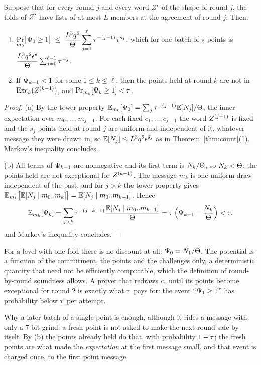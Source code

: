 \begin{lemma}[Potential]\label{lem:T}
Suppose that for every round $j$ and every word $Z'$ of the shape of round $j$, the folds of $Z'$ have lists of at most $L$ members at the agreement of round $j$. Then:
\begin{enumerate}[itemsep=1pt,topsep=2pt,label=\textnormal{(\alph*)}]
\item $\displaystyle\Pr_{m_0}\bigl[\Psi_0\ge1\bigr]\;\le\;\frac{L^3q^6}{\Theta}\sum_{j=1}^{\ell}\tau^{-(j-1)}\,\epsilon^{\bar s_j}$, which for one batch of $s$ points is $\dfrac{L^3q^6\epsilon^{s}}{\Theta}\sum_{j=0}^{\ell-1}\tau^{-j}$.
\item If $\Psi_{k-1}<1$ for some $1\le k\le\ell$, then the points held at round $k$ are not in $\operatorname{Exc}_k(Z^{(k-1)})$, and $\Pr_{m_k}[\Psi_k\ge1]<\tau$.
\end{enumerate}
\end{lemma}
\begin{proof}
(a) By the tower property $\mathbb{E}_{m_0}[\Psi_0]=\sum_j\tau^{-(j-1)}\mathbb{E}[N_j]/\Theta$, the inner expectation over $m_0,\dots,m_{j-1}$. For each fixed $c_1,\dots,c_{j-1}$ the word $Z^{(j-1)}$ is fixed and the $\bar s_j$ points held at round $j$ are uniform and independent of it, whatever message they were drawn in, so $\mathbb{E}[N_j]\le L^3q^6\epsilon^{\bar s_j}$ as in Theorem~\ref{thm:count}(1). Markov's inequality concludes.

(b) All terms of $\Psi_{k-1}$ are nonnegative and its first term is $N_k/\Theta$, so $N_k<\Theta$: the points held are not exceptional for $Z^{(k-1)}$. The message $m_k$ is one uniform draw independent of the past, and for $j>k$ the tower property gives $\mathbb{E}_{m_k}\bigl[\mathbb{E}[N_j\mid m_0..m_k]\bigr]=\mathbb{E}[N_j\mid m_0..m_{k-1}]$. Hence
\[
\mathbb{E}_{m_k}[\Psi_k]=\sum_{j>k}\tau^{-(j-k-1)}\frac{\mathbb{E}[N_j\mid m_0..m_{k-1}]}{\Theta}=\tau\,\Bigl(\Psi_{k-1}-\frac{N_k}{\Theta}\Bigr)<\tau,
\]
and Markov's inequality concludes.
\end{proof}

For a level with one fold there is no discount at all: $\Psi_0=N_1/\Theta$. The potential is a function of the commitment, the points and the challenges only, a deterministic quantity that need not be efficiently computable, which the definition of round-by-round soundness allows. A prover that redraws $c_1$ until its points become exceptional for round $2$ is exactly what $\tau$ pays for: the event ``$\Psi_1\ge1$'' has probability below $\tau$ per attempt.

Why a later batch of a single point is enough, although it rides a message with only a $7$-bit grind: a fresh point is not asked to make the next round safe by itself. By (b) the points already held do that, with probability $1-\tau$; the fresh points are what made the \emph{expectation} at the first message small, and that event is charged once, to the first point message.
